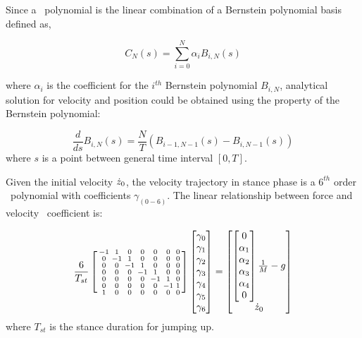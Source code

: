 Since a \Bezier\ polynomial is the linear combination of a Bernstein polynomial basis\cite{dicsibuyuk2007generalization} defined as,

\begin{equation}\label{eq:bezier}
C_N(s) = \sum_{i=0}^{N}\alpha_i B_{i,N}(s)
\end{equation}

where $\alpha_i$ is the coefficient for the $i^{th}$ Bernstein polynomial $B_{i,N}$, analytical solution for velocity and position could be obtained using the property of the Bernstein polynomial\cite{Doha2011}:

\begin{equation} \label{eq:bernstein_diff}
\frac{d}{ds}B_{i,N}(s)=\frac{N}{T}(B_{i-1,N-1}(s)-B_{i,N-1}(s))
\end{equation}
where $s$ is a point between general time interval $[0, T]$.

Given the initial velocity ${\dot{z}}_0$, the velocity trajectory in stance phase is a $6^{th}$ order \Bezier\ polynomial with coefficients $\gamma_{(0-6)}$. The linear relationship between force and velocity \Bezier\ coefficient is:

\begin{equation}\label{eq:bernstein_integration}
\frac{6}{T_{st}}\left[
\begin{smallmatrix}
-1 & 1 & 0 & 0 & 0 & 0 & 0 \\
0 &-1 & 1 & 0 & 0 & 0 & 0 \\
0 & 0 &-1 & 1 & 0 & 0 & 0 \\
0 & 0 & 0 &-1 & 1 & 0 & 0 \\
0 & 0 & 0 & 0 &-1 & 1 & 0 \\
0 & 0 & 0 & 0 & 0 &-1 & 1 \\
1 & 0 & 0 & 0 & 0 & 0 & 0 \\
\end{smallmatrix}
\right]
\left[
\begin{matrix}
\gamma_0\\\gamma_1\\\gamma_2\\\gamma_3\\\gamma_4\\\gamma_5\\\gamma_6\\
\end{matrix}
\right]
=
\left[
\begin{matrix}
\left[
\begin{matrix}
0\\\alpha_1\\\alpha_2\\\alpha_3\\\alpha_4\\0\\
\end{matrix}
\right]\frac{1}{M}-g\\
{\dot{z}}_0\\
\end{matrix}
\right]
\end{equation}
where $T_{st}$ is the stance duration for jumping up.

